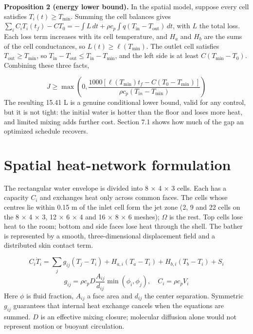\documentclass[12pt,a4paper]{article}
\begin{document}
\textbf{Proposition 2 (energy lower bound).} In the spatial model, suppose every cell satisfies $T_i(t)\ge T_{\min}$. Summing the cell balances gives $\sum_i C_iT_i(t_f)-CT_0=-\int L\,dt+\rho c_p\int q(T_{\mathrm{in}}-T_{\mathrm{out}})\,dt$, with $L$ the total loss. Each loss term increases with its cell temperature, and $H_a$ and $H_b$ are the sums of the cell conductances, so $L(t)\ge\ell(T_{\min})$. The outlet cell satisfies $T_{\mathrm{out}}\ge T_{\min}$, so $T_{\mathrm{in}}-T_{\mathrm{out}}\le T_{\mathrm{in}}-T_{\min}$, and the left side is at least $C(T_{\min}-T_0)$. Combining these three facts,

\begin{equation}J\geq\max\left(0,\frac{1000[\ell(T_{\min})t_f-C(T_0-T_{\min})]}{\rho c_p(T_{\mathrm in}-T_{\min})}\right)\end{equation}
The resulting 15.41 L is a genuine conditional lower bound, valid for any control, but it is not tight: the initial water is hotter than the floor and loses more heat, and limited mixing adds further cost. Section 7.1 shows how much of the gap an optimized schedule recovers.

\section{Spatial heat-network formulation}
The rectangular water envelope is divided into 8 × 4 × 3 cells. Each has a capacity $C_i$ and exchanges heat only across common faces. The cells whose centres lie within 0.15 m of the inlet cell form the jet zone (2, 9 and 22 cells on the 8 × 4 × 3, 12 × 6 × 4 and 16 × 8 × 6 meshes); $\Omega$ is the rest. Top cells lose heat to the room; bottom and side faces lose heat through the shell. The bather is represented by a smooth, three-dimensional displacement field and a distributed skin contact term.

\begin{equation}C_i\dot T_i=\sum_jg_{ij}(T_j-T_i)+H_{a,i}(T_a-T_i)+H_{b,i}(T_b-T_i)+S_i\end{equation}
\begin{equation}g_{ij}=\rho c_pD\frac{A_{ij}}{d_{ij}}\min(\phi_i,\phi_j),\quad C_i=\rho c_pV_i\end{equation}
Here $\phi$ is fluid fraction, $A_{ij}$ a face area and $d_{ij}$ the center separation. Symmetric $g_{ij}$ guarantees that internal heat exchange cancels when the equations are summed. $D$ is an effective mixing closure; molecular diffusion alone would not represent motion or buoyant circulation.
\end{document}
